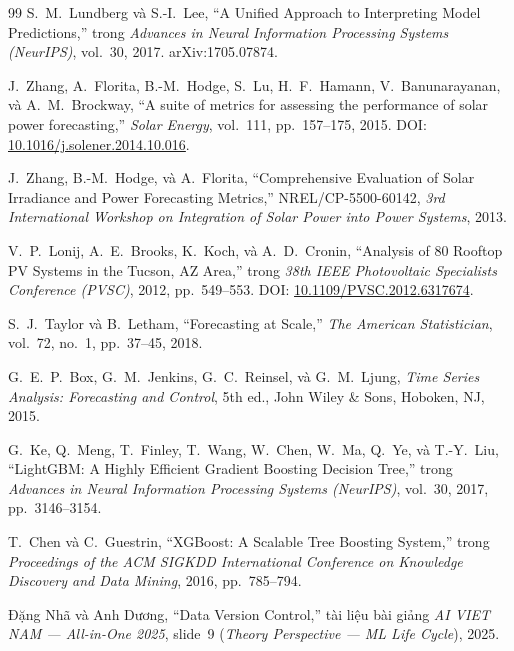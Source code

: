 \documentclass[12pt, a4paper]{report}
\begin{document}
\begin{thebibliography}{99}
S.~M.~Lundberg và S.-I.~Lee,
\newblock ``A Unified Approach to Interpreting Model Predictions,''
\newblock trong \textit{Advances in Neural Information Processing Systems (NeurIPS)}, vol.~30, 2017.
\newblock arXiv:1705.07874.

J.~Zhang, A.~Florita, B.-M.~Hodge, S.~Lu, H.~F.~Hamann, V.~Banunarayanan, và A.~M.~Brockway,
\newblock ``A suite of metrics for assessing the performance of solar power forecasting,''
\newblock \textit{Solar Energy}, vol.~111, pp.~157--175, 2015.
\newblock DOI: \href{https://doi.org/10.1016/j.solener.2014.10.016}{10.1016/j.solener.2014.10.016}.

J.~Zhang, B.-M.~Hodge, và A.~Florita,
\newblock ``Comprehensive Evaluation of Solar Irradiance and Power Forecasting Metrics,''
\newblock NREL/CP-5500-60142, \textit{3rd International Workshop on Integration of Solar Power into Power Systems}, 2013.

V.~P.~Lonij, A.~E.~Brooks, K.~Koch, và A.~D.~Cronin,
\newblock ``Analysis of 80 Rooftop PV Systems in the Tucson, AZ Area,''
\newblock trong \textit{38th IEEE Photovoltaic Specialists Conference (PVSC)}, 2012, pp.~549--553.
\newblock DOI: \href{https://doi.org/10.1109/PVSC.2012.6317674}{10.1109/PVSC.2012.6317674}.

S.~J.~Taylor và B.~Letham,
\newblock ``Forecasting at Scale,''
\newblock \textit{The American Statistician}, vol.~72, no.~1, pp.~37--45, 2018.

G.~E.~P.~Box, G.~M.~Jenkins, G.~C.~Reinsel, và G.~M.~Ljung,
\newblock \textit{Time Series Analysis: Forecasting and Control}, 5th ed.,
\newblock John Wiley \& Sons, Hoboken, NJ, 2015.

G.~Ke, Q.~Meng, T.~Finley, T.~Wang, W.~Chen, W.~Ma, Q.~Ye, và T.-Y.~Liu,
\newblock ``LightGBM: A Highly Efficient Gradient Boosting Decision Tree,''
\newblock trong \textit{Advances in Neural Information Processing Systems (NeurIPS)}, vol.~30, 2017, pp.~3146--3154.

T.~Chen và C.~Guestrin,
\newblock ``XGBoost: A Scalable Tree Boosting System,''
\newblock trong \textit{Proceedings of the ACM SIGKDD International Conference on Knowledge Discovery and Data Mining}, 2016, pp.~785--794.

Đặng Nhã và Anh Dương,
\newblock ``Data Version Control,''
\newblock tài liệu bài giảng \textit{AI VIET NAM --- All-in-One 2025}, slide~9 (\textit{Theory Perspective --- ML Life Cycle}), 2025.


\end{thebibliography}
\end{document}
